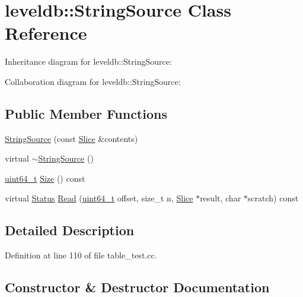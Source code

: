 \hypertarget{classleveldb_1_1_string_source}{}\section{leveldb\+:\+:String\+Source Class Reference}
\label{classleveldb_1_1_string_source}


Inheritance diagram for leveldb\+:\+:String\+Source\+:


Collaboration diagram for leveldb\+:\+:String\+Source\+:
\subsection*{Public Member Functions}
\begin{DoxyCompactItemize}
\item 
\hyperlink{classleveldb_1_1_string_source_a4f85ccda6f37775d790834de05284fda}{String\+Source} (const \hyperlink{classleveldb_1_1_slice}{Slice} \&contents)
\item 
virtual \hyperlink{classleveldb_1_1_string_source_a0d468686fe633d0cbb04ec58be474cc8}{$\sim$\+String\+Source} ()
\item 
\hyperlink{stdint_8h_aaa5d1cd013383c889537491c3cfd9aad}{uint64\+\_\+t} \hyperlink{classleveldb_1_1_string_source_af31de6d789ba2427c98673fd1eae0778}{Size} () const 
\item 
virtual \hyperlink{classleveldb_1_1_status}{Status} \hyperlink{classleveldb_1_1_string_source_a7cf8d6ee4cd01cf514ce68326e6ec3c2}{Read} (\hyperlink{stdint_8h_aaa5d1cd013383c889537491c3cfd9aad}{uint64\+\_\+t} offset, size\+\_\+t n, \hyperlink{classleveldb_1_1_slice}{Slice} $\ast$result, char $\ast$scratch) const 
\end{DoxyCompactItemize}


\subsection{Detailed Description}


Definition at line 110 of file table\+\_\+test.\+cc.



\subsection{Constructor \& Destructor Documentation}
\hypertarget{classleveldb_1_1_string_source_a4f85ccda6f37775d790834de05284fda}{}
